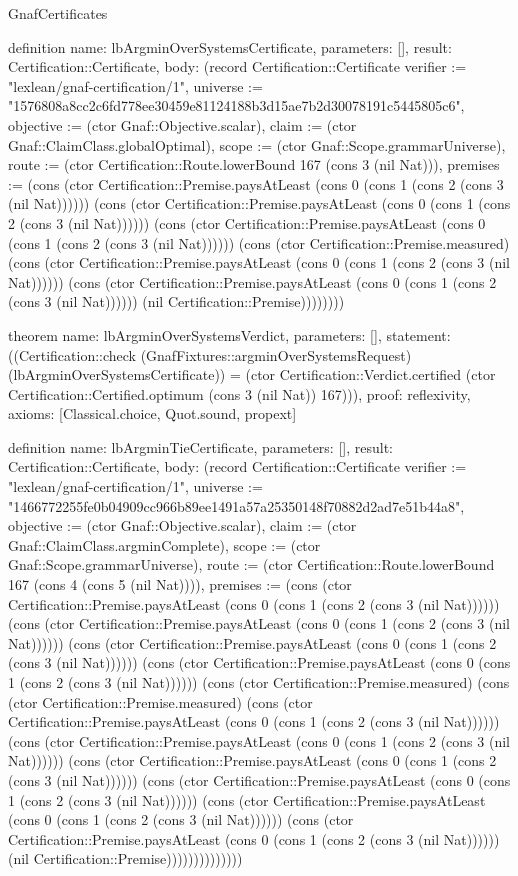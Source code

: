 \begin{lexlean}{GnafCertificates}
\begin{semanticmodule}
definition{
  name: lbArgminOverSystemsCertificate,
  parameters: [],
  result: Certification::Certificate,
  body: (record Certification::Certificate {verifier := "lexlean/gnaf-certification/1", universe := "1576808a8cc2c6fd778ee30459e81124188b3d15ae7b2d30078191c5445805c6", objective := (ctor Gnaf::Objective.scalar), claim := (ctor Gnaf::ClaimClass.globalOptimal), scope := (ctor Gnaf::Scope.grammarUniverse), route := (ctor Certification::Route.lowerBound 167 (cons 3 (nil Nat))), premises := (cons (ctor Certification::Premise.paysAtLeast (cons 0 (cons 1 (cons 2 (cons 3 (nil Nat)))))) (cons (ctor Certification::Premise.paysAtLeast (cons 0 (cons 1 (cons 2 (cons 3 (nil Nat)))))) (cons (ctor Certification::Premise.paysAtLeast (cons 0 (cons 1 (cons 2 (cons 3 (nil Nat)))))) (cons (ctor Certification::Premise.measured) (cons (ctor Certification::Premise.paysAtLeast (cons 0 (cons 1 (cons 2 (cons 3 (nil Nat)))))) (cons (ctor Certification::Premise.paysAtLeast (cons 0 (cons 1 (cons 2 (cons 3 (nil Nat)))))) (nil Certification::Premise)))))))})
}

theorem{
  name: lbArgminOverSystemsVerdict,
  parameters: [],
  statement: ((Certification::check (GnafFixtures::argminOverSystemsRequest) (lbArgminOverSystemsCertificate)) = (ctor Certification::Verdict.certified (ctor Certification::Certified.optimum (cons 3 (nil Nat)) 167))),
  proof: reflexivity{},
  axioms: [Classical.choice, Quot.sound, propext]
}

definition{
  name: lbArgminTieCertificate,
  parameters: [],
  result: Certification::Certificate,
  body: (record Certification::Certificate {verifier := "lexlean/gnaf-certification/1", universe := "1466772255fe0b04909cc966b89ee1491a57a25350148f70882d2ad7e51b44a8", objective := (ctor Gnaf::Objective.scalar), claim := (ctor Gnaf::ClaimClass.argminComplete), scope := (ctor Gnaf::Scope.grammarUniverse), route := (ctor Certification::Route.lowerBound 167 (cons 4 (cons 5 (nil Nat)))), premises := (cons (ctor Certification::Premise.paysAtLeast (cons 0 (cons 1 (cons 2 (cons 3 (nil Nat)))))) (cons (ctor Certification::Premise.paysAtLeast (cons 0 (cons 1 (cons 2 (cons 3 (nil Nat)))))) (cons (ctor Certification::Premise.paysAtLeast (cons 0 (cons 1 (cons 2 (cons 3 (nil Nat)))))) (cons (ctor Certification::Premise.paysAtLeast (cons 0 (cons 1 (cons 2 (cons 3 (nil Nat)))))) (cons (ctor Certification::Premise.measured) (cons (ctor Certification::Premise.measured) (cons (ctor Certification::Premise.paysAtLeast (cons 0 (cons 1 (cons 2 (cons 3 (nil Nat)))))) (cons (ctor Certification::Premise.paysAtLeast (cons 0 (cons 1 (cons 2 (cons 3 (nil Nat)))))) (cons (ctor Certification::Premise.paysAtLeast (cons 0 (cons 1 (cons 2 (cons 3 (nil Nat)))))) (cons (ctor Certification::Premise.paysAtLeast (cons 0 (cons 1 (cons 2 (cons 3 (nil Nat)))))) (cons (ctor Certification::Premise.paysAtLeast (cons 0 (cons 1 (cons 2 (cons 3 (nil Nat)))))) (cons (ctor Certification::Premise.paysAtLeast (cons 0 (cons 1 (cons 2 (cons 3 (nil Nat)))))) (nil Certification::Premise)))))))))))))})
}


\end{semanticmodule}
\end{lexlean}
